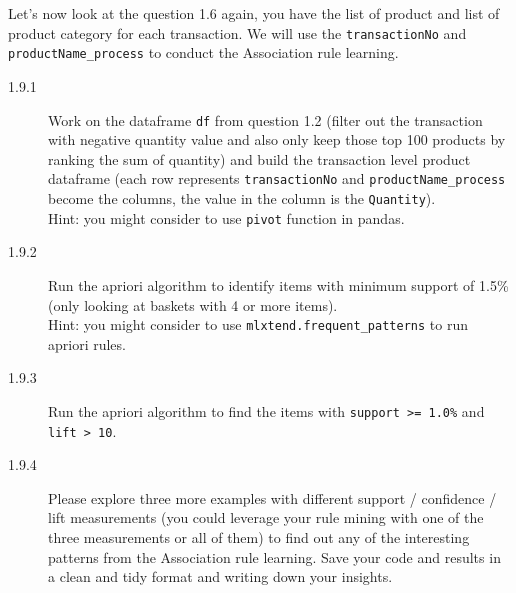 \documentclass[a4paper]{article}
\begin{document}
    \begin{answer}[Question 1.9]
    Let's now look at the question 1.6 again, you have the list of product and list of product category for each transaction. We will use the \texttt{transactionNo} and \texttt{productName_process} to conduct the Association rule learning.

    \begin{description}
        \item[1.9.1] Work on the dataframe \texttt{df} from question 1.2 (filter out the transaction with negative quantity value and also only keep those top 100 products by ranking the sum of quantity) and build the transaction level product dataframe (each row represents \texttt{transactionNo} and \texttt{productName_process} become the columns, the value in the column is the \texttt{Quantity}). \\
        Hint: you might consider to use \texttt{pivot} function in pandas.
        \item[1.9.2] Run the apriori algorithm to identify items with minimum support of 1.5\% (only looking at baskets with 4 or more items). \\
        Hint: you might consider to use \texttt{mlxtend.frequent_patterns} to run apriori rules.

        \item[1.9.3] Run the apriori algorithm to find the items with \texttt{support >= 1.0\%} and \texttt{lift > 10}. 

        \item[1.9.4] Please explore three more examples with different support / confidence / lift measurements (you could leverage your rule mining with one of the three measurements or all of them) to find out any of the interesting patterns from the Association rule learning. Save your code and results in a clean and tidy format and writing down your insights.
    \end{description}
    \end{answer}
\end{document}
